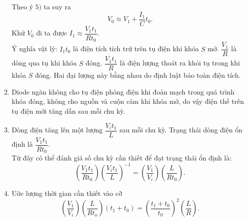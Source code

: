 \begin{loigiai}
\begin{enumerate}[1) ]
    Theo ý $5)$ ta suy ra
    \[V_0\approx V_1+\dfrac{I_1}{C}t_0.\]
    Khử $V_0$ đi ta được $I_1\approx\dfrac{V_1t_1}{Rt_0}$.\\
    Ý nghĩa vật lý: $I_1t_0$ là điện tích tích trữ trên tụ điện khi khóa $S$ mở. $\dfrac{V_1}{R}$ là dòng qua tụ khi khóa $S$ đóng. $\dfrac{V_1t_1}{R}$ là điện lượng thoát ra khỏi tụ trong khi khóa $S$ đóng. Hai đại lượng này bằng nhau do định luật bảo toàn điện tích.
    \item Diode ngăn không cho tụ điện phóng điện khi đoản mạch trong quá trình khóa đóng, không cho nguồn và cuộn cảm khi khóa mở, do vậy điện thế trên tụ điện mới tăng dần sau mỗi chu kỳ.
    \item Dòng điện tăng lên một lượng $\dfrac{V_{i}t_1}{L}$ sau mỗi chu kỳ. Trạng thái dòng điện ổn định là $\dfrac{V_1t_1}{Rt_0}$. \\
    Từ đây có thể đánh giá số chu kỳ cần thiết để đạt trạng thái ổn định là:
    \[\left(\dfrac{V_1t_1}{Rt_0}\right)\left(\dfrac{V_{i}t_1}{L}\right)^{-1}=\left(\dfrac{V_1}{V_{i}}\right)\left(\dfrac{L}{Rt_0}\right).\]
    \item Uớc lượng thời gian cần thiết vào cỡ
    \[\left(\dfrac{V_1}{V_{i}}\right)\left(\dfrac{L}{Rt_o}\right)\left(t_1+t_0\right)=\left(\dfrac{t_1+t_0}{t_0}\right)^2\left(\dfrac{L}{R}\right).\]
\end{enumerate}
\end{loigiai}


